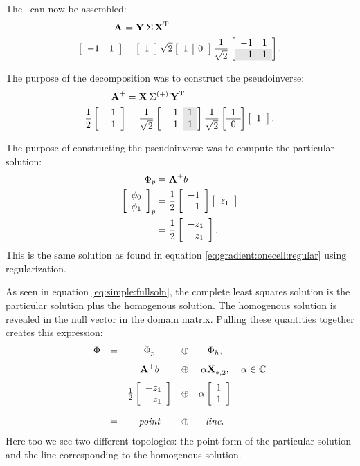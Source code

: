 The \svdl \ can now be assembled:
\begin{equation}
  \begin{split}
    \svda{T}\\
    \mat{cc}{-1&1} &=
    \mat{c}{1}
    \sqrt{2}\mat{c|c}{1&0}
    \stwo 
  \mat{rr}{-1&1\\\rowcolor{ltgray}1&1}.
  \end{split}
\end{equation}

The purpose of the decomposition was to construct the pseudoinverse:
\begin{equation}
  \begin{split}
    \mpgia{T}\\
    \rtwo\mat{r}{-1\\1} &=
    \stwo 
  \mat{r>{\columncolor{ltgray}}r}{-1&1\\1&1}
  \stwo
  \mat{c}{1\\\hline0}
  \mat{c}{1}.
  \end{split}
\end{equation}

The purpose of constructing the pseudoinverse was to compute the particular solution:
\begin{equation}
  \begin{split}
    \Phi_{p} &= \A{+}b\\
    \mat{c}{\phi_{0}\\\phi_{1}}_{p} &=
    \rtwo\mat{r}{-1\\1}
    \mat{c}{z_{1}}\\
    &=
    \rtwo\mat{r}{-z_{1}\\z_{1}}.
  \end{split}
\end{equation}
This is the same solution as found in equation \eqref{eq:gradient:onecell:regular} using regularization. 

As seen in equation \eqref{eq:simple:fullsoln}, the complete least squares solution is the particular solution plus the homogenous solution. The homogenous solution is revealed in the null vector in the domain matrix. Pulling these quantities together creates this expression:
\begin{equation}
  \begin{array}{rccccc}
    \Phi &=& \Phi_{p} &\oplus& \Phi_{h},\\[7pt]
      &=& \A{+}b &\oplus& \alpha \X{}_{*,2} , & \alpha \in \cmplx{}\\[7pt]
      &=& \rtwo\mat{r}{-z_{1}\\z_{1}} &\oplus& \alpha \mat{c}{1\\1}\\[17pt]
      &=& \textit{point} &\oplus& \textit{line}.
  \end{array}
\label{eq:simple:fullsoln}
\end{equation}
Here too we see two different topologies: the point form of the particular solution and the line corresponding to the homogenous solution.

